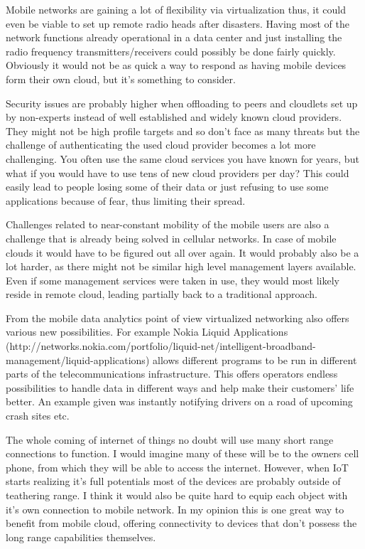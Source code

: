 \documentclass[conference]{IEEEtran}
\begin{document}
\par
Mobile networks are gaining a lot of flexibility via virtualization thus, it could even be viable to set up remote radio heads after disasters. Having most of the network functions already operational in a data center and just installing the radio frequency transmitters/receivers could possibly be done fairly quickly. Obviously it would not be as quick a way to respond as having mobile devices form their own cloud, but it's something to consider.
\par
Security issues are probably higher when offloading to peers and cloudlets set up by non-experts instead of well established and widely known cloud providers. They might not be high profile targets and so don't face as many threats but the challenge of authenticating the used cloud provider becomes a lot more challenging. You often use the same cloud services you have known for years, but what if you would have to use tens of new cloud providers per day? This could easily lead to people losing some of their data or just refusing to use some applications because of fear, thus limiting their spread.
\par
Challenges related to near-constant mobility of the mobile users are also a challenge that is already being solved in cellular networks. In case of mobile clouds it would have to be figured out all over again. It would probably also be a lot harder, as there might not be similar high level management layers available. Even if some management services were taken in use, they would most likely reside in remote cloud, leading partially back to a traditional approach.
\par
From the mobile data analytics point of view virtualized networking also offers various new possibilities. For example Nokia Liquid Applications (http://networks.nokia.com/portfolio/liquid-net/intelligent-broadband-management/liquid-applications) allows different programs to be run in different parts of the telecommunications infrastructure. This offers operators endless possibilities to handle data in different ways and help make their customers' life better. An example given was instantly notifying drivers on a road of upcoming crash sites etc.
\par
The whole coming of internet of things no doubt will use many short range connections to function. I would imagine many of these will be to the owners cell phone, from which they will be able to access the internet. However, when IoT starts realizing it's full potentials most of the devices are probably outside of teathering range. I think it would also be quite hard to equip each object with it's own connection to mobile network. In my opinion this is one great way to benefit from mobile cloud, offering connectivity to devices that don't possess the long range capabilities themselves.
\end{document}
